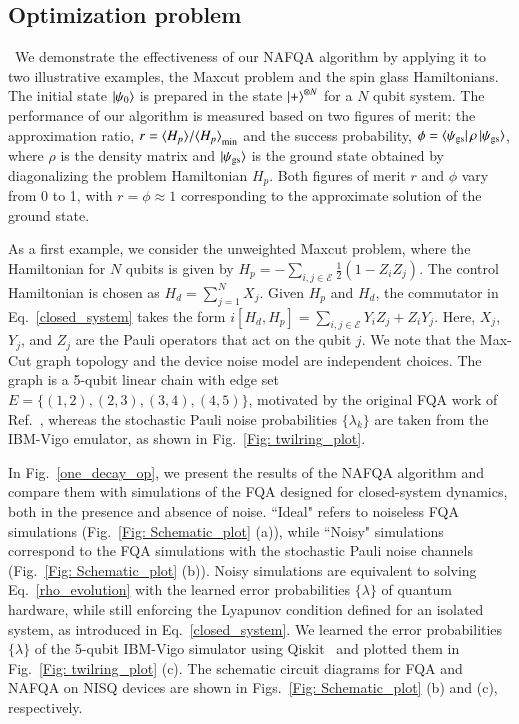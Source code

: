 \documentclass[10pt, superscriptaddress,aps,pra,twocolumn,showpacs,nofootinbib, longbibliography, notitlepage,floatfix]{revtex4-2}
\begin{document}
\subsection*{Optimization problem}~We demonstrate the effectiveness of our NAFQA algorithm by applying it to two illustrative examples, the Maxcut problem and the spin glass Hamiltonians. The initial state $\ket{\psi_0}$ is prepared in the state $\ket{+}^{\otimes N}$ for a $N$ qubit system. The performance of our algorithm is measured based on two figures of merit: the approximation ratio, $r = {\braket{H_p}}/{\braket{H_p}_{\text{min}}}$ and the success probability, $\phi = \bra{\psi_{\text{gs}}} \rho \ket{\psi_{\text{gs}}}$, where $\rho$ is the density matrix and $\ket{\psi_{\text{gs}}}$ is the ground state obtained by diagonalizing the problem Hamiltonian $H_p$. Both figures of merit $r$ and $\phi$ vary from 0 to 1, with $r = \phi \approx 1$ corresponding to the approximate solution of the ground state.

As a first example, we consider the unweighted Maxcut problem, where the Hamiltonian for $N$ qubits is given by $H_p = -\sum_{i,j\in \mathcal{E}} \frac{1}{2}(1 - Z_iZ_j)$. The control Hamiltonian is chosen as $H_d = \sum_{j = 1}^{N} X_j$. Given $H_p$ and $H_d$, the commutator in Eq.~\eqref{closed_system} takes the form $i[H_d,H_p] = \sum_{i,j\in \mathcal{E}} Y_iZ_j + Z_i Y_j$. Here, $X_j$, $Y_j$, and $Z_j$ are the Pauli operators that act on the qubit $j$. {We note that the Max-Cut graph topology and the device noise model are independent choices. The graph is a 5-qubit linear chain with edge set $E = \{(1,2),(2,3),(3,4),(4,5)\}$, motivated by the original FQA work of Ref.~\cite{SarovarPRL2022}, whereas the stochastic Pauli noise probabilities $\{\lambda_k\}$ are taken from the IBM-Vigo emulator, as shown in Fig.~\ref{Fig: twilring_plot}.}

In Fig.~\ref{one_decay_op}, we present the results of the NAFQA algorithm and compare them with simulations of the FQA designed for closed-system dynamics, both in the presence and absence of noise. ``Ideal" refers to noiseless FQA simulations (Fig.~\ref{Fig: Schematic_plot} (a)), while ``Noisy" simulations correspond to the FQA simulations with the stochastic Pauli noise channels (Fig.~\ref{Fig: Schematic_plot} (b)). Noisy simulations are equivalent to solving Eq.~\eqref{rho_evolution} with the learned error probabilities $\{\lambda\}$ of quantum hardware, while still enforcing the Lyapunov condition defined for an isolated system, as introduced in Eq.~\eqref{closed_system}. We learned the error probabilities $\{\lambda\}$ of the 5-qubit IBM-Vigo simulator using Qiskit~\cite{Qiskit2021} and plotted them in Fig.~\ref{Fig: twilring_plot} (c). The schematic circuit diagrams for FQA and NAFQA on NISQ devices are shown in Figs.~\ref{Fig: Schematic_plot} (b) and (c), respectively. 
\end{document}
